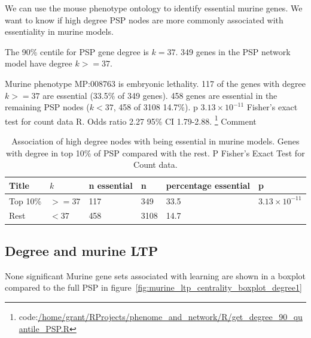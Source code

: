  We can use the mouse phenotype ontology to identify essential murine genes. 
 We want to know if high degree PSP nodes are more commonly associated with essentiality in murine models. 
 
 The 90\% centile for PSP gene degree is $k=37$. 349 genes in the PSP network model have degree $k>=37$.
 
 Murine phenotype MP:008763 is embryonic lethality. 117 of the genes with degree $k>=37$ are essential (33.5\% of 349 genes). 458 genes are essential in the remaining PSP nodes ($k < 37$, 458 of 3108 14.7\%). p $3.13 \times 10^{-11}$ Fisher's exact test for count data R. Odds ratio 2.27 95\% CI 1.79-2.88. \footnote{code:\url{/home/grant/RProjects/phenome_and_network/R/get_degree_90_quantile_PSP.R}}  Comment 
 
 \begin{table}[h]
     \centering
     \begin{tabular}{llllll}
          Title & $k$& n essential & n & percentage essential & p   \\
          \hline
          Top 10\% & $>=37$ & 117 & 349 & 33.5 & $3.13 \times 10^{-11}$\\
          Rest & $<37$ & 458 & 3108 & 14.7 & \\
     \end{tabular}
     \caption{Association of high degree nodes with being essential in murine models. Genes with degree in top 10\% of PSP compared with the rest. P Fisher's Exact Test for Count data.}
     \label{Table:Degree and murine essentialness PSP}
 \end{table}
 



\subsection{Degree and murine LTP}
None significant
Murine gene sets associated with learning are shown in a boxplot compared to the full PSP in figure~\ref{fig:murine_ltp_centrality_boxplot_degree1}


